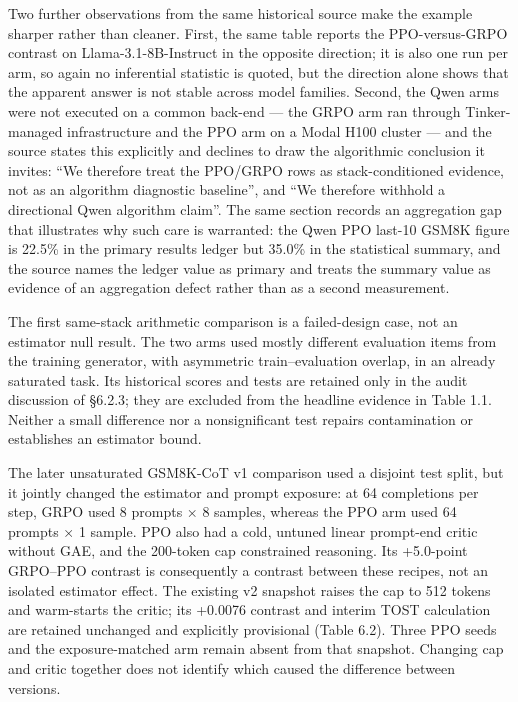 \documentclass[12pt,a4paper]{report}
\begin{document}
Two further observations from the same historical source make the
example sharper rather than cleaner. First, the same table reports the
PPO-versus-GRPO contrast on Llama-3.1-8B-Instruct in the opposite
direction; it is also one run per arm, so again no inferential statistic
is quoted, but the direction alone shows that the apparent answer is not
stable across model families. Second, the Qwen arms were not executed on
a common back-end --- the GRPO arm ran through Tinker-managed
infrastructure and the PPO arm on a Modal H100 cluster --- and the
source states this explicitly and declines to draw the algorithmic
conclusion it invites: ``We therefore treat the PPO/GRPO rows as
stack-conditioned evidence, not as an algorithm diagnostic baseline'',
and ``We therefore withhold a directional Qwen algorithm claim''. The
same section records an aggregation gap that illustrates why such care
is warranted: the Qwen PPO last-10 GSM8K figure is 22.5\% in the primary
results ledger but 35.0\% in the statistical summary, and the source
names the ledger value as primary and treats the summary value as
evidence of an aggregation defect rather than as a second measurement.

The first same-stack arithmetic comparison is a failed-design case, not
an estimator null result. The two arms used mostly different evaluation
items from the training generator, with asymmetric train--evaluation
overlap, in an already saturated task. Its historical scores and tests
are retained only in the audit discussion of §6.2.3; they are excluded
from the headline evidence in Table 1.1. Neither a small difference nor
a nonsignificant test repairs contamination or establishes an estimator
bound.

The later unsaturated GSM8K-CoT v1 comparison used a disjoint test
split, but it jointly changed the estimator and prompt exposure: at 64
completions per step, GRPO used 8 prompts × 8 samples, whereas the PPO
arm used 64 prompts × 1 sample. PPO also had a cold, untuned linear
prompt-end critic without GAE, and the 200-token cap constrained
reasoning. Its +5.0-point GRPO--PPO contrast is consequently a contrast
between these recipes, not an isolated estimator effect. The existing v2
snapshot raises the cap to 512 tokens and warm-starts the critic; its
+0.0076 contrast and interim TOST calculation are retained unchanged and
explicitly provisional (Table 6.2). Three PPO seeds and the
exposure-matched arm remain absent from that snapshot. Changing cap and
critic together does not identify which caused the difference between
versions.
\end{document}

